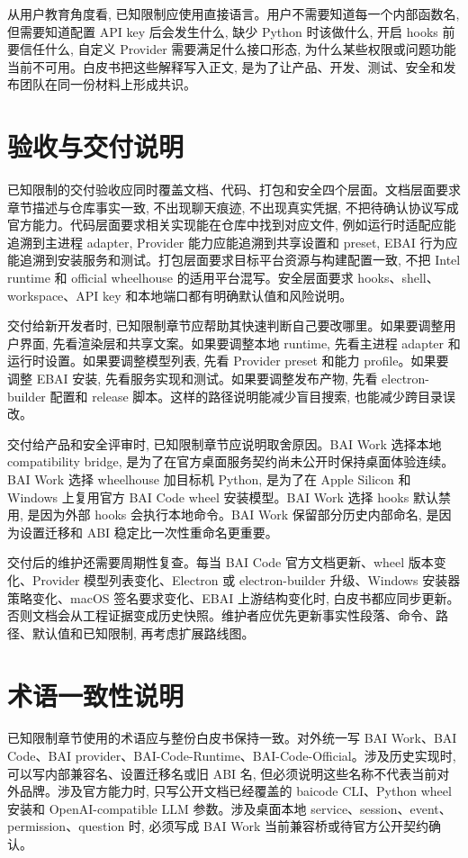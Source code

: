 从用户教育角度看, 已知限制应使用直接语言。用户不需要知道每一个内部函数名, 但需要知道配置 API key 后会发生什么, 缺少 Python 时该做什么, 开启 hooks 前要信任什么, 自定义 Provider 需要满足什么接口形态, 为什么某些权限或问题功能当前不可用。白皮书把这些解释写入正文, 是为了让产品、开发、测试、安全和发布团队在同一份材料上形成共识。

\section{验收与交付说明}
已知限制的交付验收应同时覆盖文档、代码、打包和安全四个层面。文档层面要求章节描述与仓库事实一致, 不出现聊天痕迹, 不出现真实凭据, 不把待确认协议写成官方能力。代码层面要求相关实现能在仓库中找到对应文件, 例如运行时适配应能追溯到主进程 adapter, Provider 能力应能追溯到共享设置和 preset, EBAI 行为应能追溯到安装服务和测试。打包层面要求目标平台资源与构建配置一致, 不把 Intel runtime 和 official wheelhouse 的适用平台混写。安全层面要求 hooks、shell、workspace、API key 和本地端口都有明确默认值和风险说明。

交付给新开发者时, 已知限制章节应帮助其快速判断自己要改哪里。如果要调整用户界面, 先看渲染层和共享文案。如果要调整本地 runtime, 先看主进程 adapter 和运行时设置。如果要调整模型列表, 先看 Provider preset 和能力 profile。如果要调整 EBAI 安装, 先看服务实现和测试。如果要调整发布产物, 先看 electron-builder 配置和 release 脚本。这样的路径说明能减少盲目搜索, 也能减少跨目录误改。

交付给产品和安全评审时, 已知限制章节应说明取舍原因。BAI Work 选择本地 compatibility bridge, 是为了在官方桌面服务契约尚未公开时保持桌面体验连续。BAI Work 选择 wheelhouse 加目标机 Python, 是为了在 Apple Silicon 和 Windows 上复用官方 BAI Code wheel 安装模型。BAI Work 选择 hooks 默认禁用, 是因为外部 hooks 会执行本地命令。BAI Work 保留部分历史内部命名, 是因为设置迁移和 ABI 稳定比一次性重命名更重要。

交付后的维护还需要周期性复查。每当 BAI Code 官方文档更新、wheel 版本变化、Provider 模型列表变化、Electron 或 electron-builder 升级、Windows 安装器策略变化、macOS 签名要求变化、EBAI 上游结构变化时, 白皮书都应同步更新。否则文档会从工程证据变成历史快照。维护者应优先更新事实性段落、命令、路径、默认值和已知限制, 再考虑扩展路线图。

\section{术语一致性说明}
已知限制章节使用的术语应与整份白皮书保持一致。对外统一写 BAI Work、BAI Code、BAI provider、BAI-Code-Runtime、BAI-Code-Official。涉及历史实现时, 可以写内部兼容名、设置迁移名或旧 ABI 名, 但必须说明这些名称不代表当前对外品牌。涉及官方能力时, 只写公开文档已经覆盖的 baicode CLI、Python wheel 安装和 OpenAI-compatible LLM 参数。涉及桌面本地 service、session、event、permission、question 时, 必须写成 BAI Work 当前兼容桥或待官方公开契约确认。

